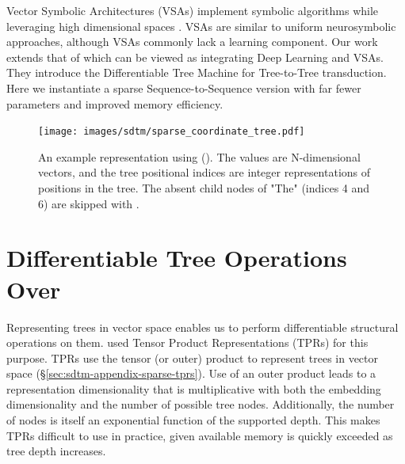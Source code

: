 

Vector Symbolic Architectures (VSAs) implement symbolic algorithms while leveraging high dimensional spaces \citep{plate, gayler2003vsa_jackendoff, kanerva2009hyperdimensional, kleyko2022}. VSAs are similar to uniform neurosymbolic approaches, although VSAs commonly lack a learning component. Our work extends that of \citet{pmlr-v202-soulos23a} which can be viewed as integrating Deep Learning and VSAs. They introduce the Differentiable Tree Machine for Tree-to-Tree transduction. Here we instantiate a sparse Sequence-to-Sequence version with far fewer parameters and improved memory efficiency.


\begin{figure}
    \centering
    \texttt{[image: images/sdtm/sparse\_coordinate\_tree.pdf]}
    \caption{An example representation using \fullrepname (\abvrepname). The values are N-dimensional vectors, and the tree positional indices are integer representations of positions in the tree. The absent child nodes of "The" (indices 4 and 6) are skipped with \abvrepname.}
    \label{fig:sparse-tpr}
\end{figure}

\section{Differentiable Tree Operations Over \fullrepname}
Representing trees in vector space enables us to perform differentiable structural operations on them. 
\citet{pmlr-v202-soulos23a} used Tensor Product Representations (TPRs) \citep{smolensky_tensor_1990} for this purpose. TPRs use the tensor (or outer) product to represent trees in vector space (\S\ref{sec:sdtm-appendix-sparse-tprs}). Use of an outer product leads to a representation dimensionality that is multiplicative with both the embedding dimensionality and the number of possible tree nodes. Additionally, the number of nodes is itself an exponential function of the supported depth. This makes TPRs difficult to use in practice, given available memory is quickly exceeded as tree depth increases.

